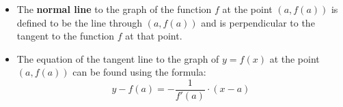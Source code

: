 \documentclass[12pt,a4paper,titlepage]{article}
\begin{document}
            \begin{SummaryBox}[title=Normal line]
                \begin{itemize}[leftmargin=*]
                    \item The \textbf{normal line} to the graph of the function $f$ at the point $(a, f(a))$ is defined to be the line through $(a, f(a))$ and is perpendicular to the tangent to the function $f$ at that point.
                    \item The equation of the tangent line to the graph of $y = f(x)$ at the point $(a, f(a))$ can be found using the formula:
                    \[
                        y - f(a) = -\frac{1}{f'(a)} \cdot (x - a)
                    \]
                \end{itemize}
            \end{SummaryBox}
            
\end{document}
